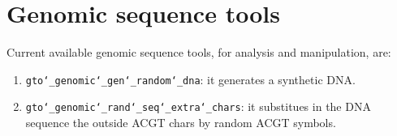 \chapter{Genomic sequence tools}
\label{gst}

Current available genomic sequence tools, for analysis and manipulation, are:
\begin{enumerate}

\item \texttt{gto\char`_genomic\char`_gen\char`_random\char`_dna}: it generates a synthetic DNA.

\item \texttt{gto\char`_genomic\char`_rand\char`_seq\char`_extra\char`_chars}: it substitues in the DNA sequence the outside ACGT chars by random ACGT symbols.

\end{enumerate}



